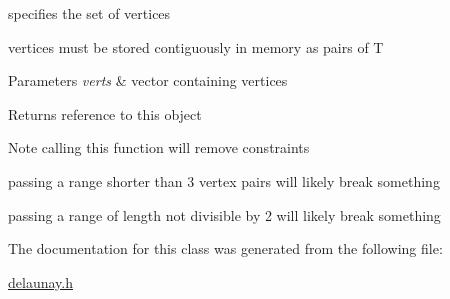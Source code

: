 specifies the set of vertices 

vertices must be stored contiguously in memory as pairs of T


\begin{DoxyParams}{Parameters}
{\em verts} & vector containing vertices \\
\hline
\end{DoxyParams}
\begin{DoxyReturn}{Returns}
reference to this object
\end{DoxyReturn}
\begin{DoxyNote}{Note}
calling this function will remove constraints 

passing a range shorter than 3 vertex pairs will likely break something 

passing a range of length not divisible by 2 will likely break something 
\end{DoxyNote}


The documentation for this class was generated from the following file\+:\begin{DoxyCompactItemize}
\item 
\hyperlink{delaunay_8h}{delaunay.\+h}\end{DoxyCompactItemize}
